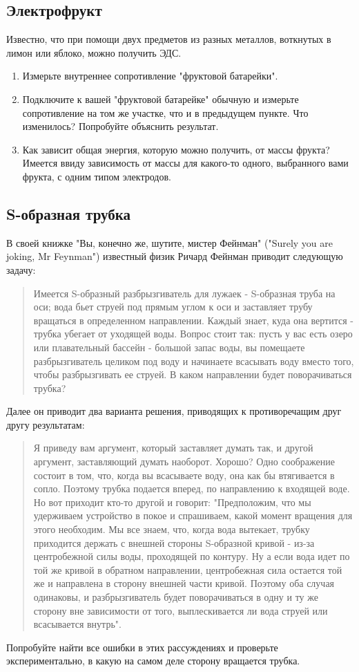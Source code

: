 \documentclass[a4paper,12pt]{article}
\begin{document}
\subsection{Электрофрукт}
Известно, что при помощи двух предметов из разных металлов, воткнутых в лимон или яблоко, можно получить ЭДС.
\begin{enumerate}
 \item Измерьте внутреннее сопротивление "фруктовой батарейки".

 \item Подключите к вашей  "фруктовой батарейке" обычную и измерьте сопротивление на том же участке, что и в предыдущем пункте. Что изменилось? Попробуйте объяснить результат.

 \item Как зависит общая энергия, которую можно получить, от массы фрукта? Имеется  ввиду зависимость от массы для какого-то одного, выбранного вами фрукта, с одним типом электродов.
\end{enumerate}

\subsection{S-образная трубка}
В своей книжке "Вы, конечно же, шутите, мистер Фейнман" ("Surely you are joking, Mr Feynman") известный физик Ричард Фейнман приводит следующую задачу:
\begin{quote} Имеется S-образный разбрызгиватель для лужаек - S-образная труба на оси; вода бьет струей под прямым углом к оси и заставляет трубу вращаться в определенном направлении. Каждый знает, куда она вертится - трубка убегает от уходящей воды. Вопрос стоит так: пусть у вас есть озеро или плавательный бассейн - большой запас воды, вы помещаете разбрызгиватель целиком под воду и начинаете всасывать воду вместо того, чтобы разбрызгивать ее струей. В каком направлении будет поворачиваться трубка?
\end{quote}
Далее он приводит два варианта решения, приводящих к противоречащим друг другу результатам:
\begin{quote}
Я приведу вам аргумент, который заставляет думать так, и другой аргумент, заставляющий думать наоборот. Хорошо?
Одно соображение состоит в том, что, когда вы всасываете воду, она как бы втягивается в сопло. Поэтому трубка подается вперед, по направлению к входящей воде.
Но вот приходит кто-то другой и говорит: "Предположим, что мы удерживаем устройство в покое и спрашиваем, какой момент вращения для этого необходим. Мы все знаем, что, когда вода вытекает, трубку приходится держать с внешней стороны S-образной кривой - из-за центробежной силы воды, проходящей по контуру. Ну а если вода идет по той же кривой в обратном направлении, центробежная сила остается той же и направлена в сторону внешней части кривой. Поэтому оба случая одинаковы, и разбрызгиватель будет поворачиваться в одну и ту же сторону вне зависимости от того, выплескивается ли вода струей или всасывается внутрь".
\end{quote}
Попробуйте найти все ошибки в этих рассуждениях и проверьте экспериментально, в какую на самом деле сторону вращается трубка.
\end{document}
